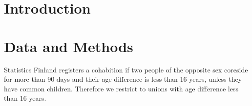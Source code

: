 \documentclass[a4paper,12pt,bibliography=totoc,numbers=noenddot,sfdefaults=false,abstract=true,notitlepage]{scrartcl} %
\begin{document}
	
	
	\begin{singlespace}
		\maketitle %
		
		\begin{abstract}
			{\parindent0pt %
				
				\blindtext
				
			}%
		\end{abstract} \hspace{10pt}
		
	\end{singlespace}
	
	
	\section{Introduction}\label{intro}
	
	
	
	
	
	
	
	
	
	
	
	\section{Data and Methods}\label{datamethods}
	
	Statistics Finland registers a cohabition if two people of the opposite sex coreside for more than 90 days and their age difference is less than 16 years, unless they have common children. Therefore we restrict to unions with age difference less than 16 years. 
	
\end{document}
